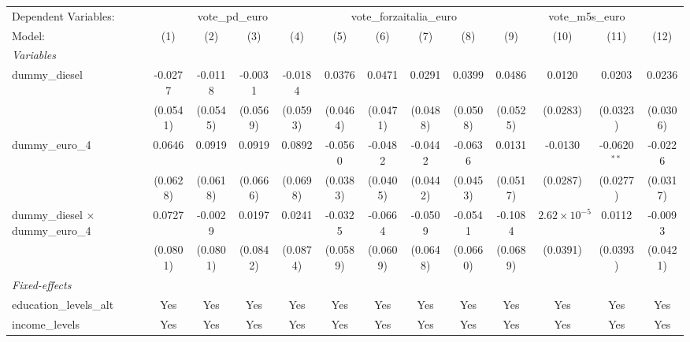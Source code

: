 \begingroup
\centering
\begin{tabular}{lcccccccccccc}
   \tabularnewline \midrule \midrule
   Dependent Variables: & \multicolumn{4}{c}{vote\_pd\_euro} & \multicolumn{4}{c}{vote\_forzaitalia\_euro} & \multicolumn{4}{c}{vote\_m5s\_euro}\\
   Model:                                    & (1)      & (2)      & (3)      & (4)      & (5)      & (6)      & (7)      & (8)      & (9)      & (10)                  & (11)           & (12)\\  
   \midrule
   \emph{Variables}\\
   dummy\_diesel                             & -0.0277  & -0.0118  & -0.0031  & -0.0184  & 0.0376   & 0.0471   & 0.0291   & 0.0399   & 0.0486   & 0.0120                & 0.0203         & 0.0236\\   
                                             & (0.0541) & (0.0545) & (0.0569) & (0.0593) & (0.0464) & (0.0471) & (0.0488) & (0.0508) & (0.0525) & (0.0283)              & (0.0323)       & (0.0306)\\   
   dummy\_euro\_4                            & 0.0646   & 0.0919   & 0.0919   & 0.0892   & -0.0560  & -0.0482  & -0.0442  & -0.0636  & 0.0131   & -0.0130               & -0.0620$^{**}$ & -0.0226\\   
                                             & (0.0628) & (0.0618) & (0.0666) & (0.0698) & (0.0383) & (0.0405) & (0.0442) & (0.0453) & (0.0517) & (0.0287)              & (0.0277)       & (0.0317)\\   
   dummy\_diesel $\times$ dummy\_euro\_4     & 0.0727   & -0.0029  & 0.0197   & 0.0241   & -0.0325  & -0.0664  & -0.0509  & -0.0541  & -0.1084  & $2.62\times 10^{-5}$  & 0.0112         & -0.0093\\   
                                             & (0.0801) & (0.0801) & (0.0842) & (0.0874) & (0.0589) & (0.0609) & (0.0648) & (0.0660) & (0.0689) & (0.0391)              & (0.0393)       & (0.0421)\\   
   \midrule
   \emph{Fixed-effects}\\
   education\_levels\_alt                    & Yes      & Yes      & Yes      & Yes      & Yes      & Yes      & Yes      & Yes      & Yes      & Yes                   & Yes            & Yes\\  
   income\_levels                            & Yes      & Yes      & Yes      & Yes      & Yes      & Yes      & Yes      & Yes      & Yes      & Yes                   & Yes            & Yes\\  

\end{tabular}
